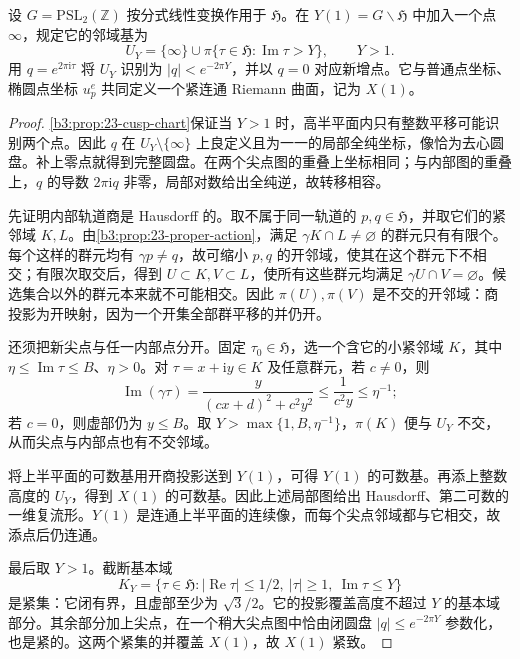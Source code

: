 \begin{proposition}[唯一尖点的紧化]\label{b3:prop:23-modular-compactification}
设 \(G=\mathrm{PSL}_2(\mathbb Z)\) 按分式线性变换作用于 \(\mathfrak H\)。在 \(Y(1)=G\backslash\mathfrak H\) 中加入一个点 \(\infty\)，规定它的邻域基为
\[
 U_Y=\{\infty\}\cup\pi\{\tau\in\mathfrak H:\operatorname{Im}\tau>Y\},
 \qquad Y>1.
\]
用 \(q=e^{2\pi\mathrm i\tau}\) 将 \(U_Y\) 识别为 \(|q|<e^{-2\pi Y}\)，并以 \(q=0\) 对应新增点。它与普通点坐标、椭圆点坐标 \(u_p^e\) 共同定义一个紧连通 Riemann 曲面，记为 \(X(1)\)。
\end{proposition}
\begin{proof}
\cref{b3:prop:23-cusp-chart}保证当 \(Y>1\) 时，高半平面内只有整数平移可能识别两个点。因此 \(q\) 在 \(U_Y\setminus\{\infty\}\) 上良定义且为一一的局部全纯坐标，像恰为去心圆盘。补上零点就得到完整圆盘。在两个尖点图的重叠上坐标相同；与内部图的重叠上，\(q\) 的导数 \(2\pi\mathrm i q\) 非零，局部对数给出全纯逆，故转移相容。

先证明内部轨道商是 Hausdorff 的。取不属于同一轨道的 \(p,q\in\mathfrak H\)，并取它们的紧邻域 \(K,L\)。由\cref{b3:prop:23-proper-action}，满足 \(\gamma K\cap L\ne\varnothing\) 的群元只有有限个。每个这样的群元均有 \(\gamma p\ne q\)，故可缩小 \(p,q\) 的开邻域，使其在这个群元下不相交；有限次取交后，得到 \(U\subset K,V\subset L\)，使所有这些群元均满足 \(\gamma U\cap V=\varnothing\)。候选集合以外的群元本来就不可能相交。因此 \(\pi(U),\pi(V)\) 是不交的开邻域：商投影为开映射，因为一个开集全部群平移的并仍开。

还须把新尖点与任一内部点分开。固定 \(\tau_0\in\mathfrak H\)，选一个含它的小紧邻域 \(K\)，其中 \(\eta\le\operatorname{Im}\tau\le B\)、\(\eta>0\)。对 \(\tau=x+\mathrm i y\in K\) 及任意群元，若 \(c\ne0\)，则
\[
 \operatorname{Im}(\gamma\tau)
 =\frac{y}{(cx+d)^2+c^2y^2}\le\frac1{c^2y}\le\eta^{-1};
\]
若 \(c=0\)，则虚部仍为 \(y\le B\)。取 \(Y>\max\{1,B,\eta^{-1}\}\)，\(\pi(K)\) 便与 \(U_Y\) 不交，从而尖点与内部点也有不交邻域。

将上半平面的可数基用开商投影送到 \(Y(1)\)，可得 \(Y(1)\) 的可数基。再添上整数高度的 \(U_Y\)，得到 \(X(1)\) 的可数基。因此上述局部图给出 Hausdorff、第二可数的一维复流形。\(Y(1)\) 是连通上半平面的连续像，而每个尖点邻域都与它相交，故添点后仍连通。

最后取 \(Y>1\)。截断基本域
\[
 K_Y=\{\tau\in\mathfrak H:|\operatorname{Re}\tau|\le1/2,
 \ |\tau|\ge1,\ \operatorname{Im}\tau\le Y\}
\]
是紧集：它闭有界，且虚部至少为 \(\sqrt3/2\)。它的投影覆盖高度不超过 \(Y\) 的基本域部分。其余部分加上尖点，在一个稍大尖点图中恰由闭圆盘 \(|q|\le e^{-2\pi Y}\) 参数化，也是紧的。这两个紧集的并覆盖 \(X(1)\)，故 \(X(1)\) 紧致。
\end{proof}

